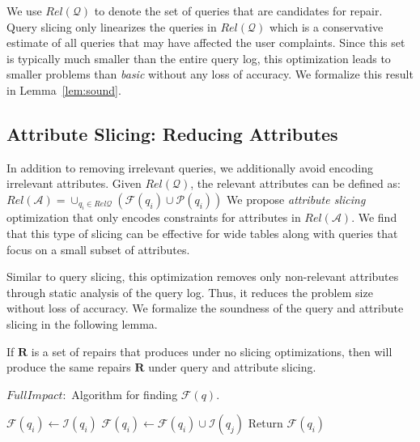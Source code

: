 We use $Rel\mathcal{(Q)}$ to denote the set of
queries that are candidates for repair.
Query slicing only linearizes the queries in $Rel\mathcal{(Q)}$ which
is a conservative estimate of all queries that may have affected the user
complaints. Since this set is typically much smaller than the entire query
log, this optimization leads to smaller problems than \emph{basic} without any
loss of accuracy.  We formalize this result in Lemma~\ref{lem:sound}.

\subsection{Attribute Slicing: Reducing Attributes}\label{sec:opt:attslice}

In addition to removing irrelevant queries, we additionally avoid encoding irrelevant attributes.
Given $Rel\mathcal{(Q)}$, the relevant attributes can be defined as:
$Rel\mathcal{(A)} = \cup_{q_i \in Rel\mathcal{Q}} (\mathcal{F}(q_i)\cup \mathcal{P}(q_i))$
We propose \emph{attribute slicing} optimization that only encodes constraints for attributes in $Rel\mathcal{(A)}$.
We find that this type of slicing can be effective for wide tables along with queries that focus on a small subset of attributes.  

Similar to query slicing, this optimization removes only non-relevant
attributes through static analysis of the query log. Thus, it reduces the problem
size without loss of accuracy. We formalize the soundness of the query and
attribute slicing in the following lemma.
% 
\begin{lemma}\label{lem:sound}
    If $\mathbf{R}$ is a set of repairs that \sys produces under no slicing
    optimizations, then \sys will produce the same repairs $\mathbf{R}$ under
    query and attribute slicing.
\end{lemma}


\begin{algorithm}[t]
\scriptsize
\caption{$FullImpact:$ Algorithm for finding $\mathcal{F}(q)$.}
\label{alg:fullimpact}
\begin{algorithmic}[2]
\STATE $\mathcal{F}(q_i) \leftarrow \mathcal{I}(q_i)$
\STATE $\mathcal{F}(q_i) \leftarrow \mathcal{F}(q_i) \cup \mathcal{I}(q_j)$
\ENDIF
\ENDFOR
\STATE Return $\mathcal{F}(q_i)$
\end{algorithmic}
\end{algorithm}



